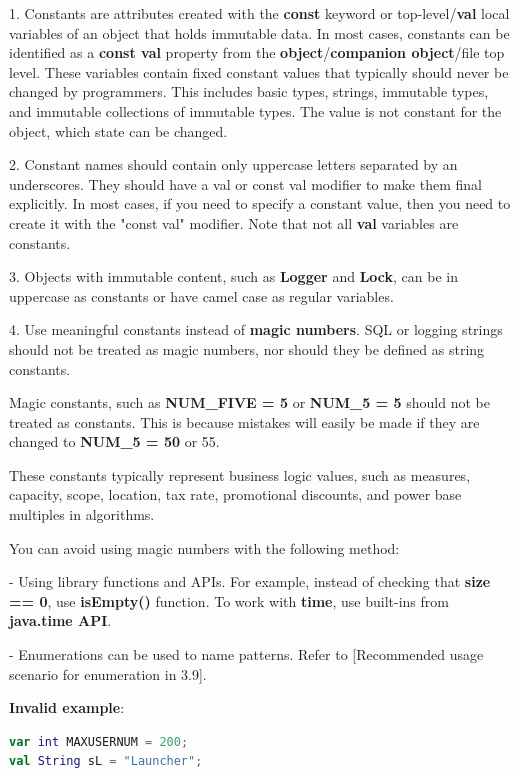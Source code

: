 {{{{{{{{{{{{{{{{1. Constants are attributes created with the \textbf{const} keyword or top-level/\textbf{val} local variables of an object that holds immutable data. In most cases, constants can be identified as a \textbf{const val} property from the \textbf{object}/\textbf{companion object}/file top level. These variables contain fixed constant values that typically should never be changed by programmers. This includes basic types, strings, immutable types, and immutable collections of immutable types. The value is not constant for the object, which state can be changed.

2. Constant names should contain only uppercase letters separated by an underscores. They should have a val or const val modifier to make them final explicitly. In most cases, if you need to specify a constant value, then you need to create it with the "const val" modifier. Note that not all \textbf{val} variables are constants.

3. Objects with immutable content, such as \textbf{Logger} and \textbf{Lock}, can be in uppercase as constants or have camel case as regular variables.

4. Use meaningful constants instead of \textbf{magic numbers}. SQL or logging strings should not be treated as magic numbers, nor should they be defined as string constants.

Magic constants, such as \textbf{NUM\_FIVE = 5} or \textbf{NUM\_5 = 5} should not be treated as constants. This is because mistakes will easily be made if they are changed to \textbf{NUM\_5 = 50} or 55.

These constants typically represent business logic values, such as measures, capacity, scope, location, tax rate, promotional discounts, and power base multiples in algorithms.

You can avoid using magic numbers with the following method:

- Using library functions and APIs. For example, instead of checking that \textbf{size == 0}, use \textbf{isEmpty()} function. To work with \textbf{time}, use built-ins from \textbf{java.time API}.

- Enumerations can be used to name patterns. Refer to [Recommended usage scenario for enumeration in 3.9].



\textbf{Invalid example}: 



\begin{lstlisting}[language=Kotlin]
var int MAXUSERNUM = 200;
val String sL = "Launcher";
\end{lstlisting}


}}}}}}}}}}}}}}}}
